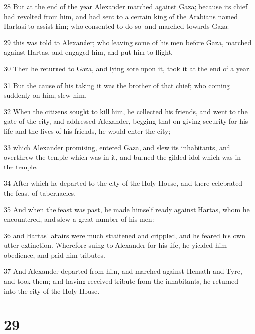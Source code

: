 \par 28 But at the end of the year Alexander marched against Gaza; because its chief had revolted from him, and had sent to a certain king of the Arabians named Hartasi to assist him; who consented to do so, and marched towards Gaza: 

\par 29 this was told to Alexander; who leaving some of his men before Gaza, marched against Hartas, and engaged him, and put him to flight. 

\par 30 Then he returned to Gaza, and lying sore upon it, took it at the end of a year. 

\par 31 But the cause of his taking it was the brother of that chief; who coming suddenly on him, slew him. 

\par 32 When the citizens sought to kill him, he collected his friends, and went to the gate of the city, and addressed Alexander, begging that on giving security for his life and the lives of his friends, he would enter the city; 

\par 33 which Alexander promising, entered Gaza, and slew its inhabitants, and overthrew the temple which was in it, and burned the gilded idol which was in the temple. 

\par 34 After which he departed to the city of the Holy House, and there celebrated the feast of tabernacles. 

\par 35 And when the feast was past, he made himself ready against Hartas, whom he encountered, and slew a great number of his men: 

\par 36 and Hartas’ affairs were much straitened and crippled, and he feared his own utter extinction. Wherefore suing to Alexander for his life, he yielded him obedience, and paid him tributes. 

\par 37 And Alexander departed from him, and marched against Hemath and Tyre, and took them; and having received tribute from the inhabitants, he returned into the city of the Holy House. 

\chapter{29}

